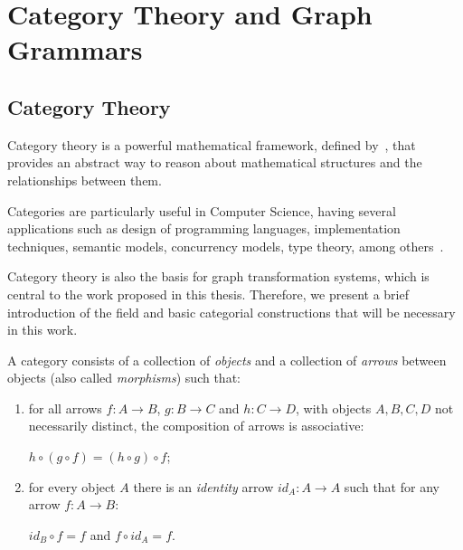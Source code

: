 \chapter{Category Theory and Graph Grammars}\label{ch:gts}

\section{Category Theory}

Category theory is a powerful mathematical framework, defined by~\cite{Eilenberg1945}, that provides an abstract way to reason about mathematical structures and the relationships between them.

Categories are particularly useful in Computer Science, having several applications such as design of programming languages, implementation techniques, semantic models, concurrency models, type theory, among others~\cite{Pierce1991}.

Category theory is also the basis for graph transformation systems, which is central to the work proposed in this thesis. Therefore, we present a brief introduction of the field and basic categorial constructions that will be necessary in this work.

\begin{definition}[Category]\label{def:category} A category  consists of a collection of \emph{objects} and a collection of \emph{arrows} between objects (also called \emph{morphisms}) such that:

  \begin{enumerate}
    \item for all arrows $f : A \rightarrow B$, $g : B \rightarrow C$ and
$h : C \rightarrow D$, with objects $A,B,C,D$ not necessarily distinct, the composition of arrows is associative:

  $h \circ (g \circ f) = (h \circ g) \circ f$;
    \item for every object $A$ there is an \emph{identity} arrow $id_A : A \rightarrow A$ such that for any arrow $f : A \rightarrow B$:

  $id_B \circ f = f$ and $f \circ id_A = f$.
  \end{enumerate}

\end{definition}

